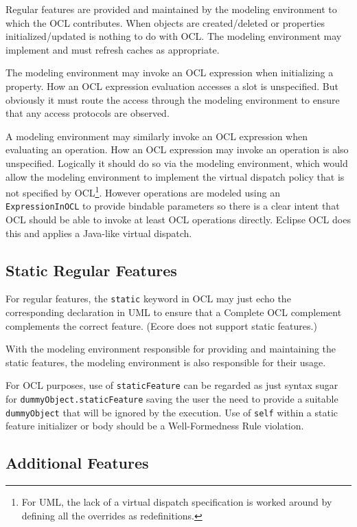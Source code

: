 \documentclass[sigconf]{acmart}
\begin{document}
Regular features are provided and maintained by the modeling environment to which the OCL contributes. When objects are created/deleted or properties initialized/updated is nothing to do with OCL. The modeling environment may implement and must refresh caches as appropriate.

The modeling environment may invoke an OCL expression when initializing a property. How an OCL expression evaluation accesses a slot is unspecified. But obviously it must route the access through the modeling environment to ensure that any access protocols are observed.

A modeling environment may similarly invoke an OCL expression when evaluating an operation. How an OCL expression may invoke an operation is also unspecified. Logically it should do so via the modeling environment, which would allow the modeling environment to implement the virtual dispatch policy that is not specified by OCL\footnote{For UML, the lack of a virtual dispatch specification is worked around by defining all the overrides as redefinitions.}. However operations are modeled using an \verb|ExpressionInOCL| to provide bindable parameters so there is a clear intent that OCL should be able to invoke at least OCL operations directly. Eclipse OCL does this and applies a Java-like virtual dispatch.

\subsection{Static Regular Features}

For regular features, the \verb|static| keyword in OCL may just echo the corresponding declaration in UML to ensure that a Complete OCL complement complements the correct feature. (Ecore does not support static features.)

With the modeling environment responsible for providing and maintaining the static features, the modeling environment is also responsible for their usage.

For OCL purposes, use of \verb|staticFeature| can be regarded as just syntax sugar for \verb|dummyObject.staticFeature| saving the user the need to provide a suitable \verb|dummyObject| that will be ignored by the execution. Use of \verb|self| within a static feature initializer or body should be a Well-Formedness Rule violation.

\subsection{Additional Features}
\end{document}
